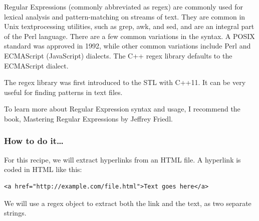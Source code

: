 
Regular Expressions (commonly abbreviated as regex) are commonly used for lexical analysis and pattern-matching on streams of text. They are common in Unix textprocessing utilities, such as grep, awk, and sed, and are an integral part of the Perl language. There are a few common variations in the syntax. A POSIX standard was approved in 1992, while other common variations include Perl and ECMAScript (JavaScript) dialects. The C++ regex library defaults to the ECMAScript dialect.

The regex library was first introduced to the STL with C++11. It can be very useful for finding patterns in text files.

To learn more about Regular Expression syntax and usage, I recommend the book, Mastering Regular Expressions by Jeffrey Friedl.

\subsubsection{How to do it…}

For this recipe, we will extract hyperlinks from an HTML file. A hyperlink is coded in HTML like this:

\begin{lstlisting}[style=styleCXX]
<a href="http://example.com/file.html">Text goes here</a>
\end{lstlisting}

We will use a regex object to extract both the link and the text, as two separate strings.


